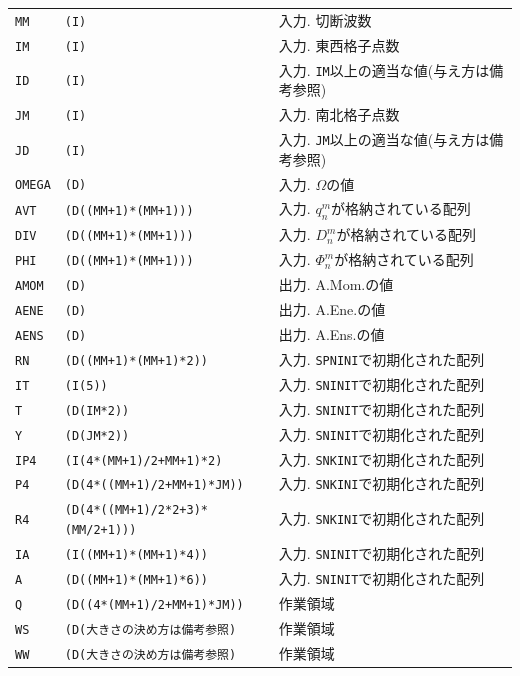 \documentclass[a4j,fleqn]{jarticle}
\begin{document}
\begin{enumerate}
\begin{tabular}{lll}
{\tt MM} & {\tt (I)} & 入力. 切断波数\\
{\tt IM} & {\tt (I)} & 入力. 東西格子点数\\
{\tt ID} & {\tt (I)} & 入力. {\tt IM}以上の適当な値(与え方は備考参照)\\
{\tt JM} & {\tt (I)} & 入力. 南北格子点数\\
{\tt JD} & {\tt (I)} & 入力. {\tt JM}以上の適当な値(与え方は備考参照)\\
{\tt OMEGA} & {\tt (D)} 
& 入力. $\Omega$の値\\
{\tt AVT} & {\tt (D((MM+1)*(MM+1)))} 
& 入力. $q^m_n$が格納されている配列\\
{\tt DIV} & {\tt (D((MM+1)*(MM+1)))} 
& 入力. $D^m_n$が格納されている配列\\
{\tt PHI} & {\tt (D((MM+1)*(MM+1)))} 
& 入力. $\Phi^m_n$が格納されている配列\\
{\tt AMOM} & {\tt (D)} 
& 出力. A.Mom.の値\\
{\tt AENE} & {\tt (D)}
& 出力. A.Ene.の値\\
{\tt AENS} & {\tt (D)} 
& 出力. A.Ens.の値\\
{\tt RN} & {\tt (D((MM+1)*(MM+1)*2))} 
& 入力. {\tt SPNINI}で初期化された配列\\
{\tt IT}  & {\tt (I(5))}    & 入力. {\tt SNINIT}で初期化された配列\\
{\tt T}   & {\tt (D(IM*2))} & 入力. {\tt SNINIT}で初期化された配列\\
{\tt Y}   & {\tt (D(JM*2))} & 入力. {\tt SNINIT}で初期化された配列\\
{\tt IP4}  & {\tt (I(4*(MM+1)/2+MM+1)*2)} 
             & 入力. {\tt SNKINI}で初期化された配列\\
{\tt P4}  & {\tt (D(4*((MM+1)/2+MM+1)*JM))} 
             & 入力. {\tt SNKINI}で初期化された配列\\
{\tt R4}  & {\tt (D(4*((MM+1)/2*2+3)*(MM/2+1)))}
             & 入力. {\tt SNKINI}で初期化された配列\\
{\tt IA}  & {\tt (I((MM+1)*(MM+1)*4))} 
             & 入力. {\tt SNINIT}で初期化された配列\\
{\tt A}  & {\tt (D((MM+1)*(MM+1)*6))}
             & 入力. {\tt SNINIT}で初期化された配列\\
{\tt Q}  & {\tt (D((4*(MM+1)/2+MM+1)*JM))} 
             & 作業領域\\
{\tt WS}  & {\tt (D(大きさの決め方は備考参照)} & 作業領域\\
{\tt WW}  & {\tt (D(大きさの決め方は備考参照)} & 作業領域
\end{tabular}


\end{enumerate}
\end{document}
